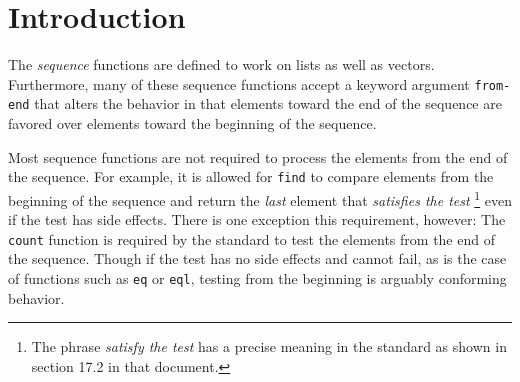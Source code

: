 \section{Introduction}

The \commonlisp{} \emph{sequence} functions are defined to work on
lists as well as vectors.  Furthermore, many of these sequence
functions accept a keyword argument \texttt{from-end} that alters the
behavior in that elements toward the end of the sequence are favored
over elements toward the beginning of the sequence.

Most sequence functions are not required to process the elements from
the end of the sequence.  For example, it is allowed for \texttt{find}
to compare elements from the beginning of the sequence and return the
\emph{last} element that \emph{satisfies the test}%
\footnote{The phrase \emph{satisfy the test} has a precise meaning in
  the \commonlisp{} standard as shown in section 17.2 in that
  document.}
even if the test has side effects.  There is one exception this
requirement, however:  The \texttt{count} function is required by the
standard to test the elements from the end of the sequence.  Though if
the test has no side effects and cannot fail, as is the case of
functions such as \texttt{eq} or \texttt{eql}, testing from the
beginning is arguably conforming behavior.


